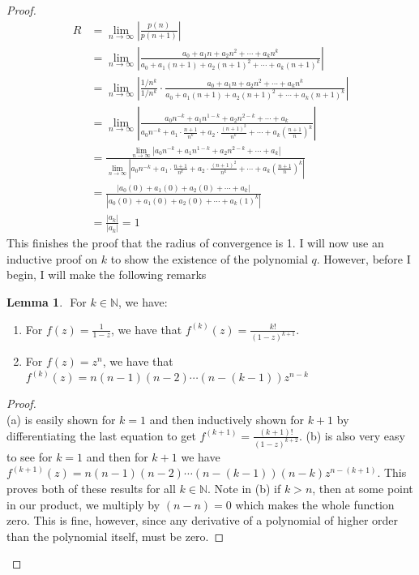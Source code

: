 \documentclass[10pt,a4paper]{article}
\theoremstyle{definition}
\newtheorem{lemma}{Lemma}
\begin{document}
\begin{proof}
\begin{align*}
R &= \lim_{n \to \infty} \left|\frac{p(n)}{p(n + 1)}\right|\\
&= \lim_{n \to \infty} \left|\frac{a_0 + a_1n + a_2n^2 + \cdots + a_kn^k}{a_0 + a_1(n + 1) + a_2(n + 1)^2 + \cdots + a_k(n + 1)^k}\right|\\
&= \lim_{n \to \infty} \left|\frac{1/n^k}{1/n^k}\cdot \frac{a_0 + a_1n + a_2n^2 + \cdots + a_kn^k}{a_0 + a_1(n + 1) + a_2(n + 1)^2 + \cdots + a_k(n + 1)^k}\right|\\
&= \lim_{n \to \infty} \left|\frac{a_0n^{-k} + a_1n^{1-k} + a_2n^{2-k} + \cdots + a_k}{a_0n^{-k} + a_1\cdot\frac{n + 1}{n^k} + a_2\cdot\frac{(n + 1)^2}{n^k} + \cdots + a_k\left(\frac{n + 1}{n}\right)^k}\right|\\
&= \frac{\displaystyle \lim_{n \to \infty} \left| a_0n^{-k} + a_1n^{1-k} + a_2n^{2-k} + \cdots + a_k \right|}{\displaystyle \lim_{n \to \infty} \left| a_0n^{-k} + a_1\cdot\frac{n + 1}{n^k} + a_2\cdot\frac{(n + 1)^2}{n^k} + \cdots + a_k\left(\frac{n + 1}{n}\right)^k \right|}\\
&= \frac{|a_0(0) + a_1(0) + a_2(0) + \cdots + a_k|}{|a_0(0) + a_1(0) + a_2(0) + \cdots + a_k(1)^k|}\\
&= \frac{|a_k|}{|a_k|} = 1
\end{align*}
This finishes the proof that the radius of convergence is 1. I will now use an inductive proof on $k$ to show the existence of the polynomial $q$. However, before I begin, I will make the following remarks
\begin{lemma}{$ $}
For $k  \in \mathbb{N}$, we have:
\begin{enumerate}[label = (\alph*)]
\item For $\displaystyle f(z) = \frac{1}{1 - z}$, we have that $\displaystyle f^{(k)}(z) = \frac{k!}{(1 - z)^{k +1}}$.
\item For $\displaystyle f(z) = z^n$, we have that $\displaystyle f^{(k)}(z) = n(n - 1)(n - 2)\cdots(n - (k - 1))z^{n - k}$
\end{enumerate}
\end{lemma}
\begin{proof}{$ $}
\\(a) is easily shown for $k = 1$ and then inductively shown for $k + 1$ by differentiating the last equation to get $\displaystyle f^{(k+1)} = \frac{(k + 1)!}{(1 - z)^{k + 2}}$. (b) is also very easy to see for $k = 1$ and then for $k + 1$ we have $f^{(k+1)}(z) = n(n - 1)(n - 2)\cdots(n - (k - 1))(n - k)z^{n - (k + 1)}$. This proves both of these results for all $k \in \mathbb{N}$. Note in (b) if $k > n$, then at some point in our product, we multiply by $(n-n) = 0$ which makes the whole function zero. This is fine, however, since any derivative of a polynomial of higher order than the polynomial itself, must be zero. 
\end{proof}


\end{proof}
\end{document}
